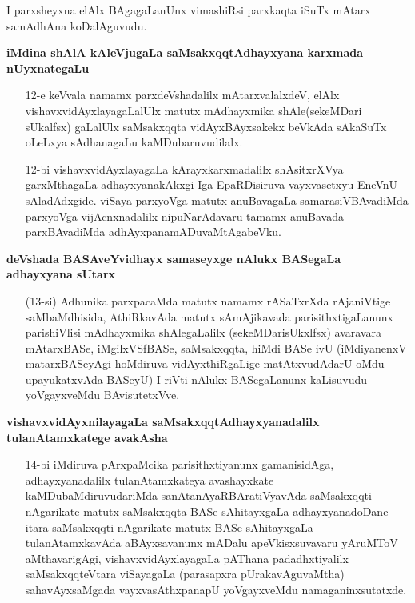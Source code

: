 I parxsheyxna elAlx BAgagaLanUnx vimashiRsi parxkaqta iSuTx mAtarx samAdhAna koDalAguvudu.

\textbf{iMdina shAlA kAleVjugaLa saMsakxqqtAdhayxyana karxmada nUyxnategaLu}

\begin{itemize}
\item[12-e] keVvala namamx parxdeVshadalilx mAtarxvalalxdeV, elAlx vishavxvidAyxlayagaLalUlx matutx mAdhayxmika shAle(sekeMDari sUkalfsx) gaLalUlx saMsakxqqta vidAyxBAyxsakekx beVkAda sAkaSuTx oLeLxya sAdhanagaLu kaMDubaruvudilalx.

\item[12-bi] vishavxvidAyxlayagaLa kArayxkarxmadalilx shAsitxrXVya garxMthagaLa adhayxyanakAkxgi Iga EpaRDisiruva vayxvasetxyu EneVnU sAladAdxgide. viSaya parxyoVga matutx anuBavagaLa samarasiVBAvadiMda parxyoVga vijAcnxnadalilx nipuNarAdavaru tamamx anuBavada parxBAvadiMda adhAyxpanamADuvaMtAgabeVku.
\end{itemize}

\textbf{deVshada BASAveYvidhayx samaseyxge nAlukx BASegaLa adhayxyana sUtarx}

\begin{itemize}
\item[(13-si)] Adhunika parxpacaMda matutx namamx rASaTxrXda rAjaniVtige saMbaMdhisida, AthiRkavAda matutx sAmAjikavada parisithxtigaLanunx parishiVlisi mAdhayxmika shAlegaLalilx (sekeMDarisUkxlfsx) avaravara mAtarxBASe, iMgilxVSfBASe, saMsakxqqta, hiMdi BASe ivU (iMdiyanenxV matarxBASeyAgi hoMdiruva vidAyxthiRgaLige matAtxvudAdarU oMdu upayukatxvAda BASeyU) I riVti nAlukx BASegaLanunx kaLisuvudu yoVgayxveMdu BAvisutetxVve.
\end{itemize}

\textbf{vishavxvidAyxnilayagaLa saMsakxqqtAdhayxyanadalilx tulanAtamxkatege avakAsha}

\begin{itemize}
\item[14-bi] iMdiruva pArxpaMcika parisithxtiyanunx gamanisidAga, adhayxyanadalilx tulanAtamxkateya avashayxkate kaMDubaMdiruvudariMda sanAtanAyaRBAratiVyavAda saMsakxqqti-nAgarikate matutx saMsakxqqta BASe sAhitayxgaLa adhayxyanadoDane itara saMsakxqqti-nAgarikate matutx BASe-sAhitayxgaLa tulanAtamxkavAda aBAyxsavanunx mADalu apeVkisxsuvavaru yAruMToV aMthavarigAgi, vishavxvidAyxlayagaLa pAThana padadhxtiyalilx saMsakxqqteVtara viSayagaLa (parasapxra pUrakavAguvaMtha) sahavAyxsaMgada vayxvasAthxpanapU yoVgayxveMdu namaganinxsutatxde.
\end{itemize}

